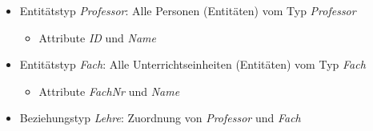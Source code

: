 \begin{frame}{\insertsection}
 \begin{itemize}
	\item Entit\"atstyp \emph{Professor}: Alle Personen (Entit\"aten) vom Typ \emph{Professor}
	\begin{itemize}
		\item Attribute \emph{ID} und \emph{Name}
	\end{itemize}
	\item Entit\"atstyp \emph{Fach}: Alle Unterrichtseinheiten (Entit\"aten) vom Typ \emph{Fach}
	\begin{itemize}
	 \item Attribute \emph{FachNr} und \emph{Name}
  \end{itemize}
	
	\item Beziehungstyp \emph{Lehre}: Zuordnung von \emph{Professor} und \emph{Fach} 
 \end{itemize}
\end{frame}

